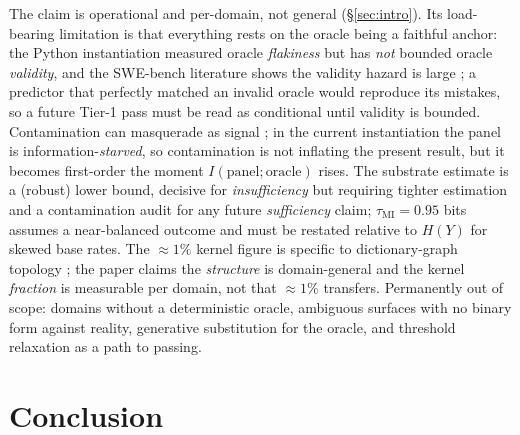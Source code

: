 \documentclass[10pt,twocolumn]{article}
\begin{document}
The claim is operational and per-domain, not general (\S\ref{sec:intro}). Its
load-bearing limitation is that everything rests on the oracle being a faithful
anchor: the Python instantiation measured oracle \emph{flakiness} but has
\emph{not} bounded oracle \emph{validity}, and the SWE-bench literature shows the
validity hazard is large \citep{aleithan2024swebenchplus, wang2025solved,
openai2026swebench}; a predictor that perfectly matched an invalid oracle would
reproduce its mistakes, so a future Tier-1 pass must be read as conditional until
validity is bounded. Contamination can masquerade as signal
\citep{aleithan2024swebenchplus}; in the current instantiation the panel is
information-\emph{starved}, so contamination is not inflating the present result,
but it becomes first-order the moment $I(\text{panel};\text{oracle})$ rises. The
substrate estimate is a (robust) lower bound, decisive for \emph{insufficiency}
but requiring tighter estimation and a contamination audit for any future
\emph{sufficiency} claim; $\tau_{\mathrm{MI}}=0.95$ bits assumes a near-balanced
outcome and must be restated relative to $H(Y)$ for skewed base rates. The
$\approx1\%$ kernel figure is specific to dictionary-graph topology
\citep{vincentlamarre2016latent}; the paper claims the \emph{structure} is
domain-general and the kernel \emph{fraction} is measurable per domain, not that
$\approx1\%$ transfers. Permanently out of scope: domains without a deterministic
oracle, ambiguous surfaces with no binary form against reality, generative
substitution for the oracle, and threshold relaxation as a path to passing.

\section{Conclusion}
\label{sec:conclusion}
\end{document}
